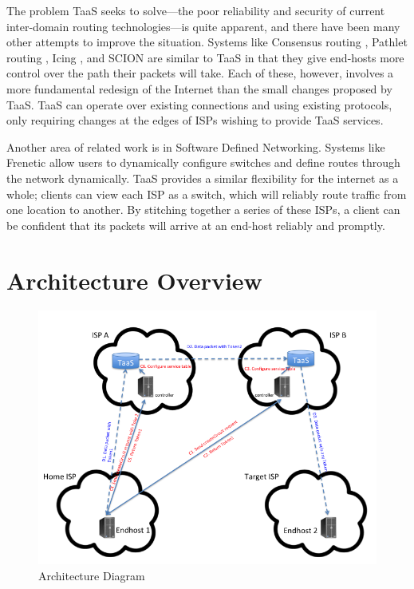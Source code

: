 \documentclass{article}
\begin{document}
The problem TaaS seeks to solve---the poor reliability and security of
current inter-domain routing technologies---is quite apparent, and
there have been many other attempts to improve the situation. Systems
like Consensus routing \cite{consensus}, Pathlet routing
\cite{pathlet}, Icing \cite{icing}, and SCION \cite{scion} are similar
to TaaS in that they give end-hosts more control over the path their
packets will take. Each of these, however, involves a more fundamental
redesign of the Internet than the small changes proposed by TaaS. TaaS
can operate over existing connections and using existing protocols,
only requiring changes at the edges of ISPs wishing to provide TaaS
services.

Another area of related work is in Software Defined
Networking. Systems like Frenetic \cite{frenetic} allow users to
dynamically configure switches and define routes through the network
dynamically. TaaS provides a similar flexibility for the internet as a
whole; clients can view each ISP as a switch, which will reliably
route traffic from one location to another. By stitching together a
series of these ISPs, a client can be confident that its packets will
arrive at an end-host reliably and promptly.

\section{Architecture Overview}
\begin{figure}
\includegraphics[width=\linewidth]{diagram}
\caption{Architecture Diagram}
\label{fig:diagram}
\end{figure}
\end{document}
